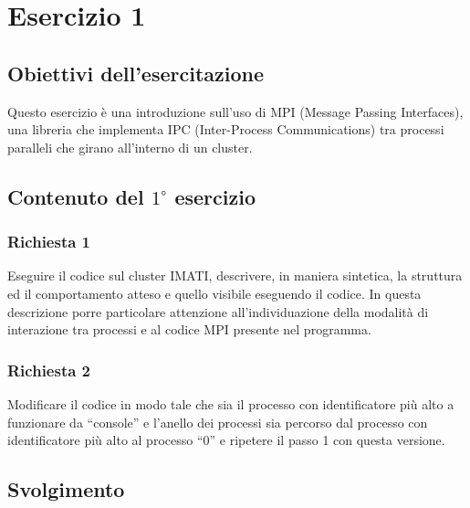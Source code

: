 


%



\chapter*{Esercizio 1}

\section*{Obiettivi dell'esercitazione}
Questo esercizio \`e una introduzione sull'uso di MPI (Message Passing Interfaces), una libreria che implementa IPC (Inter-Process Communications) tra processi paralleli che girano all'interno di un cluster.

\section*{Contenuto del $1^\circ$ esercizio}
\subsection*{Richiesta 1}
Eseguire il codice sul cluster IMATI, descrivere, in maniera sintetica, la struttura ed il comportamento atteso e quello visibile eseguendo il codice. In questa descrizione porre particolare attenzione all'individuazione della modalit\`a di interazione tra processi e al codice MPI presente nel programma.

\subsection*{Richiesta 2}
Modificare il codice in modo tale che sia il processo con identificatore pi\`u alto a funzionare da “console” e l'anello dei processi sia percorso dal processo con identificatore pi\`u alto al processo “0” e ripetere il passo 1 con questa versione.\\



\section*{Svolgimento}
